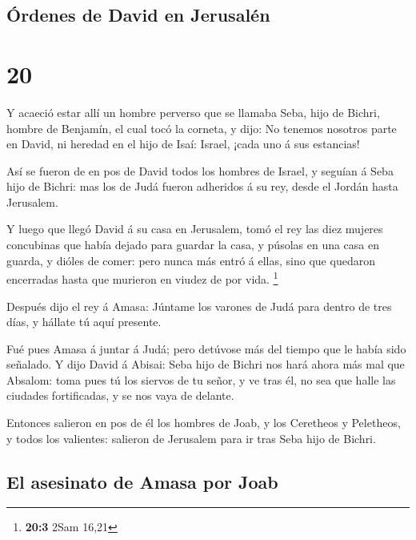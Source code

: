\hypertarget{uxf3rdenes-de-david-en-jerusaluxe9n}{%
\subsection{Órdenes de David en
Jerusalén}\label{uxf3rdenes-de-david-en-jerusaluxe9n}}

\hypertarget{section-19}{%
\section{20}\label{section-19}}

 Y acaeció estar allí un hombre perverso que se llamaba
Seba, hijo de Bichri, hombre de Benjamín, el cual tocó la corneta, y
dijo: No tenemos nosotros parte en David, ni heredad en el hijo de Isaí:
Israel, ¡cada uno á sus estancias!

 Así se fueron de en pos de David todos los hombres de
Israel, y seguían á Seba hijo de Bichri: mas los de Judá fueron
adheridos á su rey, desde el Jordán hasta Jerusalem.

 Y luego que llegó David á su casa en Jerusalem, tomó el
rey las diez mujeres concubinas que había dejado para guardar la casa, y
púsolas en una casa en guarda, y dióles de comer: pero nunca más entró á
ellas, sino que quedaron encerradas hasta que murieron en viudez de por
vida. \footnote{\textbf{20:3} 2Sam 16,21}

 Después dijo el rey á Amasa: Júntame los varones de Judá
para dentro de tres días, y hállate tú aquí presente.

 Fué pues Amasa á juntar á Judá; pero detúvose más del
tiempo que le había sido señalado.  Y dijo David á Abisai:
Seba hijo de Bichri nos hará ahora más mal que Absalom: toma pues tú los
siervos de tu señor, y ve tras él, no sea que halle las ciudades
fortificadas, y se nos vaya de delante.

 Entonces salieron en pos de él los hombres de Joab, y los
Ceretheos y Peletheos, y todos los valientes: salieron de Jerusalem para
ir tras Seba hijo de Bichri.

\hypertarget{el-asesinato-de-amasa-por-joab}{%
\subsection{El asesinato de Amasa por
Joab}\label{el-asesinato-de-amasa-por-joab}}

